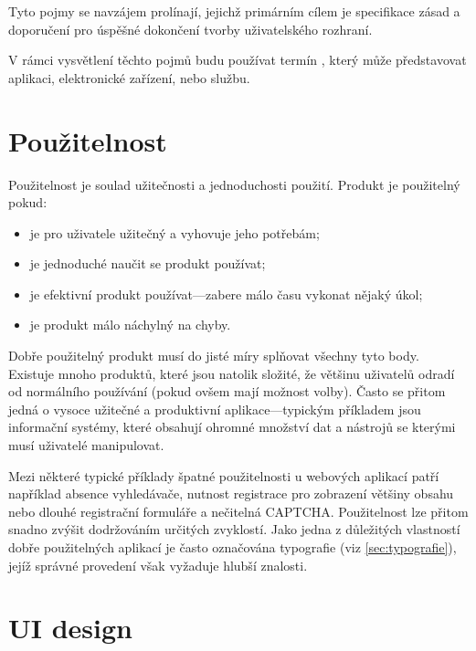 Tyto pojmy se navzájem prolínají, jejichž primárním cílem je specifikace zásad a doporučení pro úspěšné dokončení tvorby uživatelského rozhraní.

V rámci vysvětlení těchto pojmů budu používat termín , který může představovat aplikaci, elektronické zařízení, nebo službu.

\section{Použitelnost}
\label{sec:usability}

Použitelnost je soulad užitečnosti a jednoduchosti použití. Produkt je použitelný pokud:

\begin{itemize}
    \item je pro uživatele užitečný a vyhovuje jeho potřebám;
    \item je jednoduché naučit se produkt používat;
    \item je efektivní produkt používat---zabere málo času vykonat nějaký úkol;
    \item je produkt málo náchylný na chyby.
\end{itemize}

Dobře použitelný produkt musí do jisté míry splňovat všechny tyto body. Existuje mnoho produktů, které jsou natolik složité, že většinu uživatelů odradí od normálního používání (pokud ovšem mají možnost volby). Často se přitom jedná o vysoce užitečné a produktivní aplikace---typickým příkladem jsou informační systémy, které obsahují ohromné množství dat a nástrojů se kterými musí uživatelé manipulovat.

Mezi některé typické příklady špatné použitelnosti u webových aplikací patří například absence vyhledávače, nutnost registrace pro zobrazení většiny obsahu nebo dlouhé registrační formuláře a nečitelná CAPTCHA\footnotemark[1]. Použitelnost lze přitom snadno zvýšit dodržováním určitých zvyklostí. Jako jedna z důležitých vlastností dobře použitelných aplikací je často označována typografie (viz \ref{sec:typografie}), jejíž správné provedení však vyžaduje hlubší znalosti.


\section{UI design}
\label{sec:uidesign}

